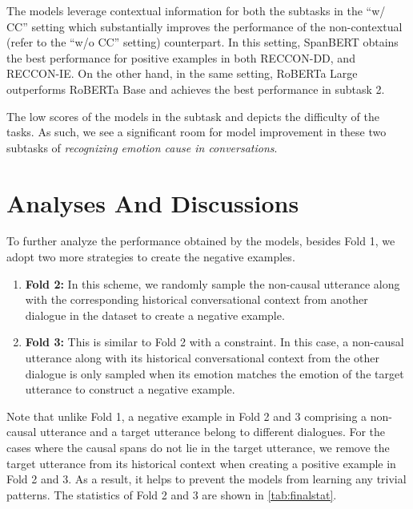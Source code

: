 \documentclass[11pt,a4paper]{article}
\theoremstyle{definition}
\newcommand\RECCON{\emph{recognizing emotion cause in conversations}}
\newcommand\RECCONDADD{RECCON-DD}
\newcommand\RECCONDAIE{RECCON-IE}
\begin{document}
The models leverage contextual information for both the subtasks in the ``w/ CC'' setting which substantially improves the performance of the non-contextual (refer to the ``w/o CC'' setting) counterpart. In this setting, SpanBERT obtains the best performance for positive examples in both \RECCONDADD{}, and \RECCONDAIE{}. On the other hand, in the same setting, RoBERTa Large outperforms RoBERTa Base and achieves the best performance in subtask 2.


The low scores of the models in the subtask  and  depicts the difficulty of the tasks. As such, we see a significant room for model improvement in these two subtasks of \RECCON{}.

\section{Analyses And Discussions} \label{sec:analysis}
To further analyze the performance obtained by the models, besides Fold 1, we adopt two more strategies to create the negative examples.
\begin{enumerate}[leftmargin=*]
\item \textbf{Fold 2:} In this scheme, we randomly sample the non-causal utterance  along with the corresponding historical conversational context  from another dialogue in the dataset to create a negative example.
\item \textbf{Fold 3:} This is similar to Fold 2 with a constraint. In this case, a non-causal utterance  along with its historical conversational context  from the other dialogue is only sampled when its emotion matches the emotion of the target utterance  to construct a negative example.
\end{enumerate}
Note that unlike Fold 1, a negative example in Fold 2 and 3 comprising a non-causal utterance  and a target utterance  belong to different dialogues. For the cases where the causal spans do not lie in the target utterance, we remove the target utterance from its historical context when creating a positive example in Fold 2 and 3. As a result, it helps to prevent the models from learning any trivial patterns. The statistics of Fold 2 and 3 are shown in \cref{tab:finalstat}.
\end{document}
